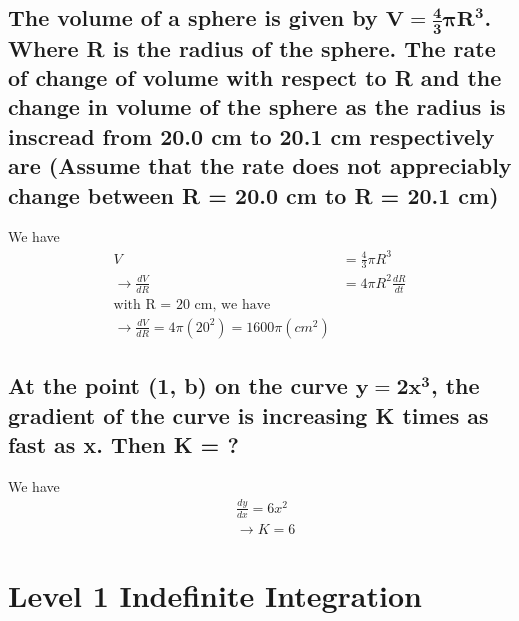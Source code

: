 \documentclass{article}
\begin{document}
\begin{multicols}{2}
    
\subsection{The volume of a sphere is given by $\mathbf{V = \frac{4}{3}\pi R^3}$. Where R is the radius of the sphere. The rate of change of volume with respect to R and the change in volume of the sphere as the radius 
is inscread from 20.0 cm to 20.1 cm respectively are (Assume that the rate does not appreciably change between R = 20.0 cm to R = 20.1 cm)}
We have
\begin{align*}
    V &= \frac{4}{3}\pi R^3 \\
    \rightarrow \frac{dV}{dR} &= 4\pi R^2 \frac{dR}{dt} \\
    \text{with R = 20 cm, we have} \\
    \rightarrow \frac{dV}{dR} = 4\pi (20^2) = 1600 \pi (cm^2)
\end{align*}


\subsection{At the point (1, b) on the curve $\mathbf{y = 2x^3}$, the gradient of the curve is increasing K times as fast as x. Then K = ?}
We have
\begin{align*}
    &\frac{dy}{dx} = 6x^2 \\
    &\rightarrow K = 6
\end{align*}

\end{multicols}

\section{Level 1 Indefinite Integration}
\end{document}
